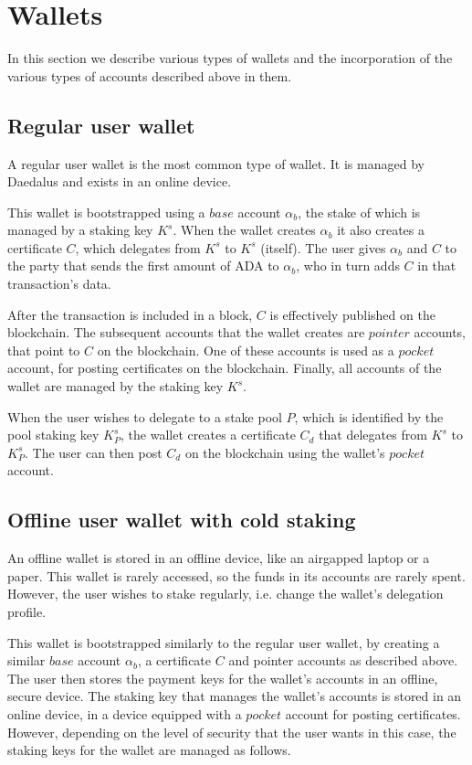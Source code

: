 \section{Wallets}

In this section we describe various types of wallets and the incorporation of the various types of accounts described above in them.

\subsection{Regular user wallet}

A regular user wallet is the most common type of wallet. It is managed by Daedalus and exists in an online device.

This wallet is bootstrapped using a $base$ account ${\alpha}_b$, the stake of which is managed by a staking key $K^s$. When the wallet creates ${\alpha}_b$ it also creates a certificate $C$, which delegates from $K^s$ to $K^s$ (itself). The user gives ${\alpha}_b$ and $C$ to the party that sends the first amount of ADA to ${\alpha}_b$, who in turn adds $C$ in that transaction's data.

After the transaction is included in a block, $C$ is effectively published on the blockchain. The subsequent accounts that the wallet creates are $pointer$ accounts, that point to $C$ on the blockchain. One of these accounts is used as a $pocket$ account, for posting certificates on the blockchain. Finally, all accounts of the wallet are managed by the staking key $K^s$.

When the user wishes to delegate to a stake pool $P$, which is identified by the pool staking key $K^s_P$, the wallet creates a certificate $C_d$ that delegates from $K^s$ to $K^s_P$. The user can then post $C_d$ on the blockchain using the wallet's $pocket$ account.

\subsection{Offline user wallet with cold staking}

An offline wallet is stored in an offline device, like an airgapped laptop or a paper. This wallet is rarely accessed, so the funds in its accounts are rarely spent. However, the user wishes to stake regularly, i.e. change the wallet's delegation profile.

This wallet is bootstrapped similarly to the regular user wallet, by creating a similar $base$ account ${\alpha}_b$, a certificate $C$ and pointer accounts as described above. The user then stores the payment keys for the wallet's accounts in an offline, secure device. The staking key that manages the wallet's accounts is stored in an online device, in a device equipped with a $pocket$ account for posting certificates. However, depending on the level of security that the user wants in this case, the staking keys for the wallet are managed as follows.

